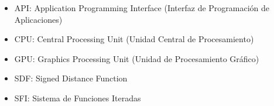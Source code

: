 \begin{itemize}
\item API: Application Programming Interface (Interfaz de Programación de Aplicaciones)
\item CPU: Central Processing Unit (Unidad Central de Procesamiento)
\item GPU: Graphics Processing Unit (Unidad de Procesamiento Gráfico)
\item SDF: Signed Distance Function
\item SFI: Sistema de Funciones Iteradas
\end{itemize}